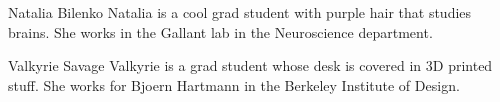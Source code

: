 \documentclass[journal]{IEEEtran}
\begin{document}
%
%
%




% 

\begin{IEEEbiography}{Natalia Bilenko}
Natalia is a cool grad student with purple hair that studies brains.  She works in the Gallant lab in the Neuroscience department.
\end{IEEEbiography}

\begin{IEEEbiography}{Valkyrie Savage}
Valkyrie is a grad student whose desk is covered in 3D printed stuff.  She works for Bjoern Hartmann in the Berkeley Institute of Design.
\end{IEEEbiography}
\end{document}
